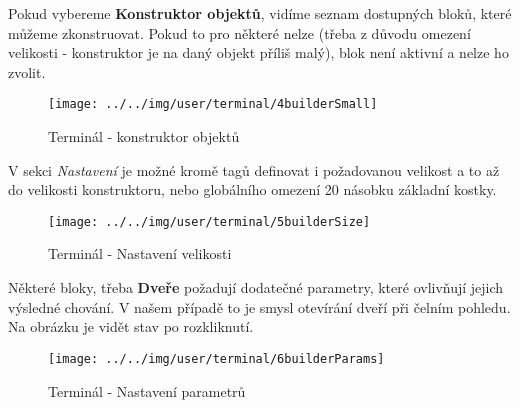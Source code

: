 \FloatBarrier

Pokud vybereme \textbf{Konstruktor objektů}, vidíme seznam dostupných bloků, které můžeme zkonstruovat. Pokud to pro některé nelze (třeba z důvodu omezení velikosti - konstruktor je na daný objekt příliš malý), blok není aktivní a nelze ho zvolit.


\begin{figure}[!ht]\centering
\texttt{[image: ../../img/user/terminal/4builderSmall]}

\caption{Terminál - konstruktor objektů}
\label{fig:user_terminal_4builderSmall}

\end{figure}

\FloatBarrier

V sekci \textit{Nastavení} je možné kromě tagů definovat i požadovanou velikost a to až do velikosti konstruktoru, nebo globálního omezení 20 násobku základní kostky.

\begin{figure}[!ht]\centering
\texttt{[image: ../../img/user/terminal/5builderSize]}

\caption{Terminál - Nastavení velikosti}
\label{fig:user_terminal_5builderSize}

\end{figure}

\FloatBarrier

Některé bloky, třeba \textbf{Dveře} požadují dodatečné parametry, které ovlivňují jejich výsledné chování. V našem případě to je smysl otevírání dveří při čelním pohledu. Na obrázku je vidět stav po rozkliknutí.

\begin{figure}[!ht]\centering
\texttt{[image: ../../img/user/terminal/6builderParams]}

\caption{Terminál - Nastavení parametrů}
\label{fig:user_terminal_6builderParams}

\end{figure}

\FloatBarrier